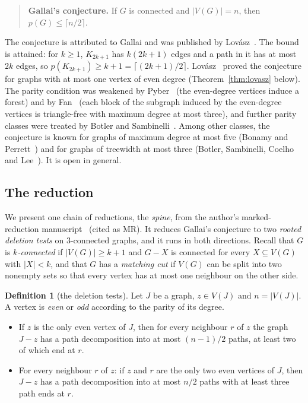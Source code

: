 \documentclass[11pt]{amsart}
\theoremstyle{definition}
\newtheorem{definition}[theorem]{Definition}
\theoremstyle{remark}
\renewcommand{\_}{\oldunderscore\allowbreak}
\begin{document}
\begin{quote}
\textbf{Gallai's conjecture.} If $G$ is connected and $|V(G)|=n$, then $p(G)\le\lceil n/2\rceil$.
\end{quote}

The conjecture is attributed to Gallai and was published by Lov\'asz~\cite{L68}. The bound is
attained: for $k\ge1$, $K_{2k+1}$ has $k(2k+1)$ edges and a path in it has at most $2k$ edges, so
$p(K_{2k+1})\ge k+1=\lceil (2k+1)/2\rceil$. Lov\'asz~\cite{L68} proved the conjecture for graphs
with at most one vertex of even degree (Theorem~\ref{thm:lovasz} below). The parity condition was
weakened by Pyber~\cite{Pyb96} (the even-degree vertices induce a forest) and by
Fan~\cite{Fan05} (each block of the subgraph induced by the even-degree vertices is triangle-free
with maximum degree at most three), and further parity classes were treated by Botler and
Sambinelli~\cite{BS21}. Among other classes, the conjecture is known for graphs of maximum degree at
most five (Bonamy and Perrett~\cite{BP19}) and for graphs of treewidth at most three (Botler,
Sambinelli, Coelho and Lee~\cite{BSCL20}). It is open in general.

\subsection*{The reduction}
We present one chain of reductions, the \emph{spine}, from the author's marked-reduction
manuscript~\cite{MR} (cited as MR). It reduces Gallai's conjecture to two \emph{rooted deletion
tests} on $3$-connected graphs, and it runs in both directions. Recall that $G$ is
\emph{$k$-connected} if $|V(G)|\ge k+1$ and $G-X$ is connected for every $X\subseteq V(G)$ with
$|X|<k$, and that $G$ has a \emph{matching cut} if $V(G)$ can be split into two nonempty sets so
that every vertex has at most one neighbour on the other side.

\begin{definition}[the deletion tests]\label{def:tests}
Let $J$ be a graph, $z\in V(J)$ and $n=|V(J)|$. A vertex is \emph{even} or \emph{odd} according to
the parity of its degree.
\begin{itemize}[leftmargin=3.2em]
\item[(T1)] If $z$ is the only even vertex of $J$, then for every neighbour $r$ of $z$ the graph
$J-z$ has a path decomposition into at most $(n-1)/2$ paths, at least two of which end at $r$.
\item[(T2)] For every neighbour $r$ of $z$: if $z$ and $r$ are the only two even vertices of $J$,
then $J-z$ has a path decomposition into at most $n/2$ paths with at least three path ends at $r$.
\end{itemize}
\end{definition}
\end{document}
